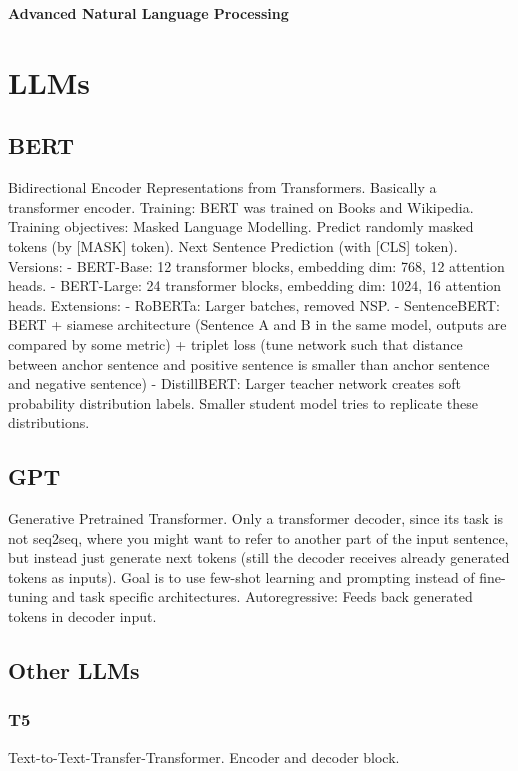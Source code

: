 \documentclass{scrartcl}
\begin{document}
\onehalfspacing
\obeylines
\setlength{\parindent}{0pt}
\begin{center}\LARGE\textbf{Advanced Natural Language Processing}\end{center}

\section{LLMs}
\subsection*{BERT}
Bidirectional Encoder Representations from Transformers.
Basically a transformer encoder.
Training: BERT was trained on Books and Wikipedia.
Training objectives: Masked Language Modelling. Predict randomly masked tokens (by [MASK] token). Next Sentence Prediction (with [CLS] token).
Versions: 
- BERT-Base: 12 transformer blocks, embedding dim: 768, 12 attention heads. 
- BERT-Large: 24 transformer blocks, embedding dim: 1024, 16 attention heads.
Extensions:
- RoBERTa: Larger batches, removed NSP.
- SentenceBERT: BERT + siamese architecture (Sentence A and B in the same model, outputs are compared by some metric) + triplet loss (tune network such that distance between anchor sentence and positive sentence is smaller than anchor sentence and negative sentence)
- DistillBERT: Larger teacher network creates soft probability distribution labels. Smaller student model tries to replicate these distributions.

\subsection*{GPT}
Generative Pretrained Transformer.
Only a transformer decoder, since its task is not seq2seq, where you might want to refer to another part of the input sentence, but instead just generate next tokens (still the decoder receives already generated tokens as inputs).
Goal is to use few-shot learning and prompting instead of fine-tuning and task specific architectures.
Autoregressive: Feeds back generated tokens in decoder input.

\subsection*{Other LLMs}
\subsubsection*{T5}
Text-to-Text-Transfer-Transformer.
Encoder and decoder block.
\end{document}
